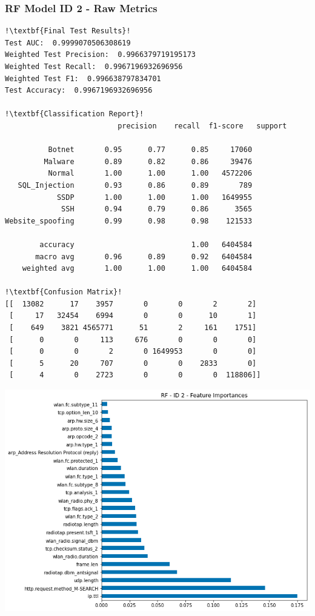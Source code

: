 \begin{appendices}
\newpage
\subsubsection{RF Model ID 2 - Raw Metrics}
\begin{lstlisting}[escapechar=!]
!\textbf{Final Test Results}!
Test AUC:  0.9999070506308619
Weighted Test Precision:  0.9966379719195173
Weighted Test Recall:  0.9967196932696956
Weighted Test F1:  0.996638797834701
Test Accuracy:  0.9967196932696956

!\textbf{Classification Report}!
				          precision    recall  f1-score   support

          Botnet       0.95      0.77      0.85     17060
         Malware       0.89      0.82      0.86     39476
          Normal       1.00      1.00      1.00   4572206
   SQL_Injection       0.93      0.86      0.89       789
            SSDP       1.00      1.00      1.00   1649955
             SSH       0.94      0.79      0.86      3565
Website_spoofing       0.99      0.98      0.98    121533

        accuracy                           1.00   6404584
       macro avg       0.96      0.89      0.92   6404584
    weighted avg       1.00      1.00      1.00   6404584
    
!\textbf{Confusion Matrix}!    
[[  13082      17    3957       0       0       2       2]
 [     17   32454    6994       0       0      10       1]
 [    649    3821 4565771      51       2     161    1751]
 [      0       0     113     676       0       0       0]
 [      0       0       2       0 1649953       0       0]
 [      5      20     707       0       0    2833       0]
 [      4       0    2723       0       0       0  118806]]
\end{lstlisting}
\begin{center}
	\centering
	\includegraphics[width=\textwidth]{Appendices/Images/RF/Model2/RF_Model2_FI.png}
\end{center}



\end{appendices}
